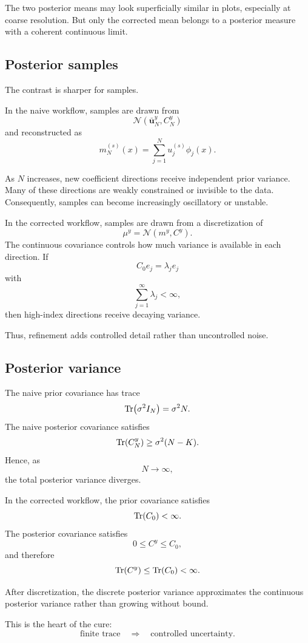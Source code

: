 \documentclass[11pt,a4paper]{book}
\newcommand{\post}{\mu^y}
\begin{document}
The two posterior means may look superficially similar in plots, especially at
coarse resolution. But only the corrected mean belongs to a posterior measure
with a coherent continuous limit.

\subsection{Posterior samples}

The contrast is sharper for samples.

In the naive workflow, samples are drawn from
\[
    \mathcal{N}(\bar{\bm{u}}_N^y,C_N^y)
\]
and reconstructed as
\[
    m_N^{(s)}(x)
    =
    \sum_{j=1}^N u_j^{(s)}\phi_j(x).
\]

As $N$ increases, new coefficient directions receive independent prior
variance. Many of these directions are weakly constrained or invisible to the
data. Consequently, samples can become increasingly oscillatory or unstable.

In the corrected workflow, samples are drawn from a discretization of
\[
    \post=\mathcal{N}(m^y,C^y).
\]
The continuous covariance controls how much variance is available in each
direction. If
\[
    C_0 e_j=\lambda_j e_j
\]
with
\[
    \sum_{j=1}^{\infty}\lambda_j<\infty,
\]
then high-index directions receive decaying variance.

Thus, refinement adds controlled detail rather than uncontrolled noise.

\subsection{Posterior variance}

The naive prior covariance has trace
\[
    \Tr(\sigma^2 I_N)=\sigma^2 N.
\]
The naive posterior covariance satisfies
\[
    \Tr(C_N^y)
    \geq
    \sigma^2(N-K).
\]
Hence, as
\[
    N\to\infty,
\]
the total posterior variance diverges.

In the corrected workflow, the prior covariance satisfies
\[
    \Tr(C_0)<\infty.
\]
The posterior covariance satisfies
\[
    0\leq C^y\leq C_0,
\]
and therefore
\[
    \Tr(C^y)\leq\Tr(C_0)<\infty.
\]

After discretization, the discrete posterior variance approximates the
continuous posterior variance rather than growing without bound.

This is the heart of the cure:
\[
    \text{finite trace}
    \quad\Rightarrow\quad
    \text{controlled uncertainty}.
\]
\end{document}
